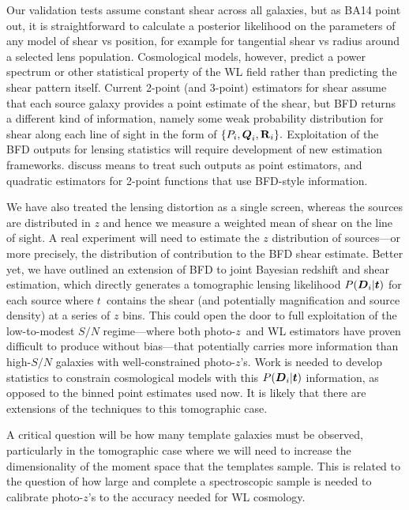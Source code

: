 \documentclass[11pt,preprint,flushrt]{aastex}
\newcommand{\vecD}{\mbox{\boldmath $D$}}
\newcommand{\vecQ}{\mbox{\boldmath $Q$}}
\newcommand{\vect}{\mbox{\boldmath $t$}}
\newcommand{\matR}{\mbox{$\bf R$}}
\newcommand{\photoz}{photo-$z$}
\begin{document}
Our validation tests assume constant shear across all galaxies, but as
BA14 point out, it is straightforward to calculate a posterior
likelihood on the parameters of any model of shear vs position, for
example for tangential shear vs radius around a selected lens
population.
Cosmological models, however, predict a power spectrum or
other statistical property of the WL field rather than predicting the
shear pattern itself.  Current 2-point (and 3-point) estimators for
shear assume that each source galaxy provides a point estimate of the
shear, but BFD returns a different kind of information, namely some
weak probability distribution for shear along each line of sight in the
form of $\{P_i, \vecQ_i, \matR_i\}.$ 
Exploitation of the BFD outputs for lensing statistics will require
development of new estimation frameworks.  \citet{MMSS} discuss means
to treat such outputs as point estimators, and quadratic estimators
for 2-point functions that use BFD-style information.

We have also treated the lensing distortion as a single screen,
whereas the sources are distributed in $z$ and hence we measure a
weighted mean of shear on the line of sight.  A real experiment will
need to estimate the $z$ distribution of sources---or more precisely,
the distribution of contribution to the BFD shear estimate.  Better
yet, we have outlined an extension of BFD to joint Bayesian redshift
and shear estimation, which directly generates a tomographic lensing
likelihood $P(\vecD_i | \vect)$ for each source where \vect\ contains
the shear (and potentially magnification and source density) at a
series of $z$ bins.  This could open the door to full exploitation of
the low-to-modest $S/N$ regime---where both \photoz\ and WL estimators
have proven difficult to produce without bias---that potentially carries more
information than high-$S/N$ galaxies with well-constrained \photoz's.  Work is 
needed to develop statistics to constrain cosmological models with this
$P(\vecD_i|\vect)$ information, as opposed to the binned point estimates used
now.  It is likely that there are extensions of the \citet{MMSS}
techniques to this tomographic case.

A critical question will be
how many template galaxies must be observed, particularly in the
tomographic case where we will need to increase the dimensionality of
the moment space that the templates sample.  This is related to the
question of how large and complete a spectroscopic sample is needed to
calibrate \photoz's to the accuracy needed for WL cosmology.
\end{document}
